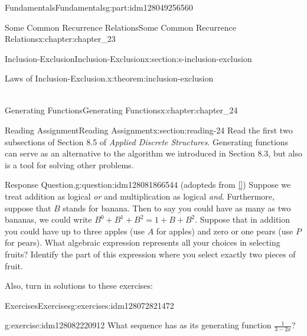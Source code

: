 \documentclass[oneside,10pt,]{book}
\newcommand{\xreffont}{\relax}
\numberwithin{equation}{section}
\begin{document}
\begin{partptx}{Fundamentals}{}{Fundamentals}{}{}{g:part:idm128049256560}
\begin{chapterptx}{Some Common Recurrence Relations}{}{Some Common Recurrence Relations}{}{}{x:chapter:chapter_23}
\begin{sectionptx}{Inclusion-Exclusion}{}{Inclusion-Exclusion}{}{}{x:section:s-inclusion-exclusion}
\begin{theorem}{Laws of Inclusion-Exclusion.}{}{x:theorem:inclusion-exclusion}
\begin{enumerate}[label=(\alph*)]
\begin{equation*}
\begin{split}
\end{split} 
\end{equation*}
%
\end{enumerate}
%
\end{theorem}
\end{sectionptx}
\end{chapterptx}
%
\typeout{************************************************}
\typeout{************************************************}
%
\begin{chapterptx}{Generating Functions}{}{Generating Functions}{}{}{x:chapter:chapter_24}
\index{}%
%
%
\typeout{************************************************}
\typeout{************************************************}
%
\begin{sectionptx}{Reading Assignment}{}{Reading Assignment}{}{}{x:section:reading-24}
Read the first two subsections of Section 8.5 of \emph{Applied Discrete Structures}. Generating functions can serve as an alternative to the algorithm we introduced in Section 8.3, but also is a tool for solving other problems.%
\begin{question}{Response Question.}{g:question:idm128081866544}%
(adopteds from \hyperlink{x:biblio:biblio-bogart-2017}{[{\xreffont 1}]}) Suppose we treat addition as logical \emph{or} and multiplication as logical \emph{and}.  Furthermore, suppose that \(B\) stands for banana.  Then to say you could have as many as two bananas, we could write \(B^0+B^1+B^2=1+B+B^2\).  Suppose that in addition you could have up to three apples (use \(A\) for apples) and zero or one pears (use \(P\) for pears).  What algebraic expression represents all your choices in selecting fruits?  Identify the part of this expression where you select exactly two pieces of fruit.%
\end{question}
Also, turn in solutions to these exercises:%
%
%
\typeout{************************************************}
\typeout{************************************************}
%
\begin{exercises-subsection}{Exercises}{}{Exercises}{}{}{g:exercises:idm128072821472}
\par\medskip\noindent%
%
\begin{exercisegroup}
\begin{divisionexerciseeg}{1}{}{}{g:exercise:idm128082220912}%
What sequence has as its generating function \(\frac{1}{3-2x}\)?%
\end{divisionexerciseeg}%

\end{exercisegroup}
\end{exercises-subsection}
\end{sectionptx}
\end{chapterptx}
\end{partptx}
\end{document}

